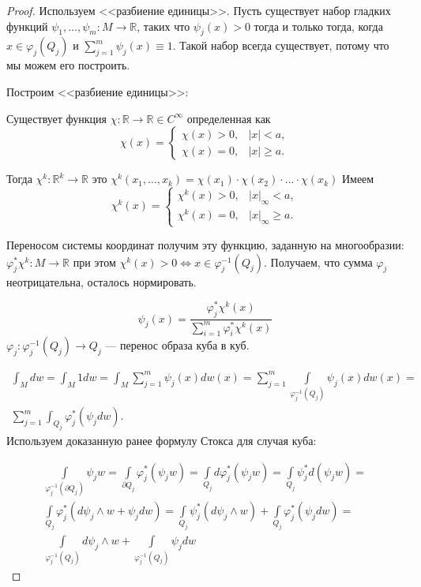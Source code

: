 \documentclass[a5paper]{article}
\theoremstyle{plain}
\theoremstyle{definition}
\numberwithin{through}{section}
\numberwithin{equation}{section}
\begin{document}
\begin{proof}
	Используем <<разбиение единицы>>. Пусть существует набор гладких функций $\psi_1,\ldots, \psi_m : M \to \mathbb{R}$,
	таких что $\psi_j(x) > 0$ тогда и только тогда, 
	когда $x \in \varphi_j(Q_j)$ и $\sum\limits_{j=1}^m \psi_j(x) \equiv 1$.
	Такой набор всегда существует, потому что мы можем его построить.
	
	Построим <<разбиение единицы>>:
	
	Существует функция $\chi: \mathbb{R} \to \mathbb{R} \in C^\infty$ определенная как 
	\[ \chi(x) = 
	\begin{cases}
	\chi(x)> 0, & |x|<a, \\
	\chi(x) = 0, &|x| \geq a.
	\end{cases} 
	\]
	
	Тогда $\chi^k:\mathbb{R}^k \to \mathbb{R}$ это $\chi^k(x_1,\ldots, x_k) = 
	\chi(x_1)\cdot\chi(x_2)\cdot\ldots\cdot\chi(x_k)$
	Имеем
	\[ \chi^k(x) =
	\begin{cases}
	\chi^k(x) >0, & |x|_\infty < a,\\
	\chi^k(x) = 0, & |x|_\infty \geq a.
	\end{cases} \]
	
	Переносом системы координат получим эту функцию, заданную на многообразии:
	$\varphi^*_j \chi^k: M \to \mathbb{R}$ при этом $\chi^k(x) > 0 \iff x \in \varphi^{-1}_j(Q_j)$.
	Получаем, что сумма $\varphi_j$ неотрицательна, осталось нормировать.
	
	\[ \psi_j(x) = \frac{\varphi^*_j \chi^k(x)}{\sum_{i=1}^m \varphi_i^* \chi^k(x)} \]
	$\varphi_j: \varphi_j^{-1}(Q_j) \to Q_j$ --- перенос образа куба в куб.
	
	\begin{eqnarray}\nonumber
	\int_M dw = \int_M 1dw = \int_M \sum_{j=1}^m \psi_j(x)dw(x) = \sum_{j=1}^m \int\limits_{\varphi_j^{-1}(Q_j)} \psi_j(x)dw(x) =\\\nonumber 
	\sum_{j=1}^m \int_{Q_j} \varphi^*_j (\psi_jdw).
	\end{eqnarray}
	Используем доказанную ранее формулу Стокса для случая куба:
	
	\begin{eqnarray}\nonumber
	\int\limits_{\varphi_j^{-1}(\partial Q_j)} \psi_j w = \int\limits_{\partial Q_j} \varphi^*_j (\psi_j w) = \int\limits_{Q_j} d\varphi^*_j(\psi_j w) = \int\limits_{Q_j} \psi^*_jd(\psi_j w) = \\\nonumber
	\int\limits_{Q_j} \varphi^*_j \left( d\psi_j \wedge w + \psi_jdw \right)
	= \int\limits_{Q_j} \psi_j^*(d\psi_j \wedge w) + \int\limits_{Q_j} \varphi^*_j (\psi_jdw) =\\\nonumber
	\int\limits_{\varphi^{-1}_j(Q_j)} d\psi_j \wedge w + \int\limits_{\varphi^{-1}_j(Q_j)} \psi_j dw
	\end{eqnarray}
	

\end{proof}
\end{document}
